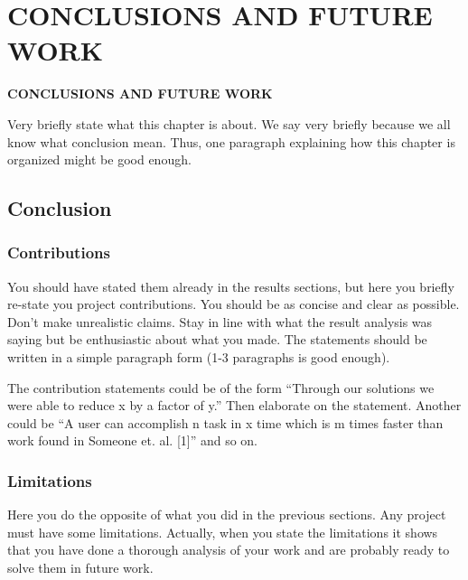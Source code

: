 \chapter{CONCLUSIONS AND FUTURE WORK}
\pagebreak

\begin{center}
{\LARGE\textbf{CONCLUSIONS AND FUTURE WORK}}
\end{center}

Very briefly state what this chapter is about. We say very briefly because we all know what conclusion mean. Thus, one paragraph explaining how this chapter is organized might be good enough.


\section{Conclusion} %
\label{sec:conclusion}


\subsection{Contributions} %
\label{sub:contributions}

You should have stated them already in the results sections, but here you briefly re-state you project contributions. You should be as concise and clear as possible. Don't make unrealistic claims. Stay in line with what the result analysis was saying but be enthusiastic about what you made. The statements should be written in a simple paragraph form (1-3 paragraphs is good enough). 

The contribution statements could be of the form ``Through our solutions we were able to reduce x by a factor of y.'' Then elaborate on the statement. Another could be ``A user can accomplish n task in x time which is m times faster than work found in Someone et. al. [1]'' and so on. 



\subsection{Limitations} %
\label{sub:limitations}

Here you do the opposite of what you did in the previous sections. Any project must have some limitations. Actually, when you state the limitations it shows that you have done a thorough analysis of your work and are probably ready to solve them in future work. 

